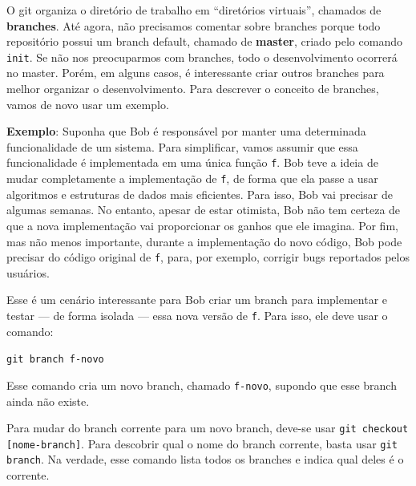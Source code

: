 \documentclass[
  11pt,
  twoside]{book}
\newcommand{\passthrough}[1]{#1}
\begin{document}
  

O git organiza o diretório de trabalho em ``diretórios virtuais'',
chamados de \textbf{branches}. Até agora, não precisamos comentar sobre
branches porque todo repositório possui um branch default, chamado de
\textbf{master}, criado pelo comando \passthrough{\lstinline!init!}. Se
não nos preocuparmos com branches, todo o desenvolvimento ocorrerá no
master. Porém, em alguns casos, é interessante criar outros branches
para melhor organizar o desenvolvimento. Para descrever o conceito de
branches, vamos de novo usar um exemplo.

\textbf{Exemplo}: Suponha que Bob é responsável por manter uma
determinada funcionalidade de um sistema. Para simplificar, vamos
assumir que essa funcionalidade é implementada em uma única função
\passthrough{\lstinline!f!}. Bob teve a ideia de mudar completamente a
implementação de \passthrough{\lstinline!f!}, de forma que ela passe a
usar algoritmos e estruturas de dados mais eficientes. Para isso, Bob
vai precisar de algumas semanas. No entanto, apesar de estar otimista,
Bob não tem certeza de que a nova implementação vai proporcionar os
ganhos que ele imagina. Por fim, mas não menos importante, durante a
implementação do novo código, Bob pode precisar do código original de
\passthrough{\lstinline!f!}, para, por exemplo, corrigir bugs reportados
pelos usuários.

Esse é um cenário interessante para Bob criar um branch para implementar
e testar --- de forma isolada --- essa nova versão de
\passthrough{\lstinline!f!}. Para isso, ele deve usar o comando:

\passthrough{\lstinline!git branch f-novo!}

Esse comando cria um novo branch, chamado
\passthrough{\lstinline!f-novo!}, supondo que esse branch ainda não
existe.

Para mudar do branch corrente para um novo branch, deve-se usar
\passthrough{\lstinline!git checkout [nome-branch]!}. Para descobrir
qual o nome do branch corrente, basta usar
\passthrough{\lstinline!git branch!}. Na verdade, esse comando lista
todos os branches e indica qual deles é o corrente.
\end{document}
